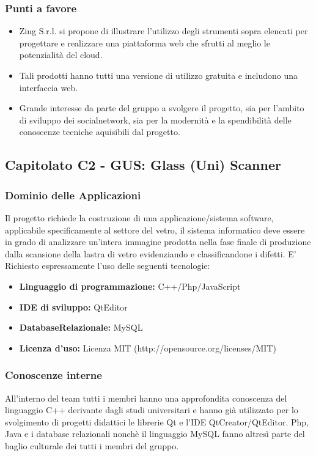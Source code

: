   \subsubsection{Punti a favore}
  \begin{itemize}
     \item Zing S.r.l. si propone di illustrare l’utilizzo degli strumenti sopra elencati per progettare e realizzare una piattaforma web che sfrutti al meglio le potenzialità del cloud.
     \item Tali prodotti hanno tutti una versione di utilizzo gratuita e includono una interfaccia web.
     \item Grande interesse da parte del gruppo a svolgere il progetto, sia per l'ambito di sviluppo dei socialnetwork, sia per la modernità e la spendibilità delle conoscenze tecniche aquisibili dal progetto.
  \end{itemize}
\subsection{Capitolato C2 - GUS: Glass (Uni) Scanner}
  \subsubsection{Dominio delle Applicazioni}
  Il progetto richiede la costruzione di una applicazione/sistema software, applicabile specificamente al settore del vetro, il  sistema  informatico deve essere in grado di analizzare un'intera immagine prodotta nella fase finale di produzione dalla scansione della lastra di vetro evidenziando e classificandone i difetti. E' Richiesto espressamente l'uso delle seguenti tecnologie:
  \begin{itemize}
  	\item \textbf{Linguaggio  di  programmazione:} C++/Php/JavaScript
  	\item \textbf{IDE di sviluppo:} QtEditor
  	\item \textbf{DatabaseRelazionale:} MySQL
  	\item \textbf{Licenza d'uso:} Licenza MIT (http://opensource.org/licenses/MIT)
  \end{itemize}
  \subsubsection{Conoscenze interne}
  All'interno del team tutti i membri hanno una approfondita conoscenza del linguaggio C++ derivante dagli studi universitari e hanno già utilizzato per lo svolgimento di progetti didattici le librerie Qt e l'IDE QtCreator/QtEditor. Php, Java e i database relazionali nonchè il linguaggio MySQL fanno altresì parte del baglio culturale dei tutti i membri del gruppo.
